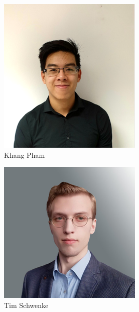 \begin{figure}[h]
	\includegraphics{img/profil-khang-pham}
	\caption{Khang Pham}
	\label{fig:profil-khang-pham}
\end{figure}

\begin{figure}[h]
	\includegraphics{img/profil-tim-schwenke}
	\caption{Tim Schwenke}
	\label{fig:profil-tim-schwenke}
\end{figure}